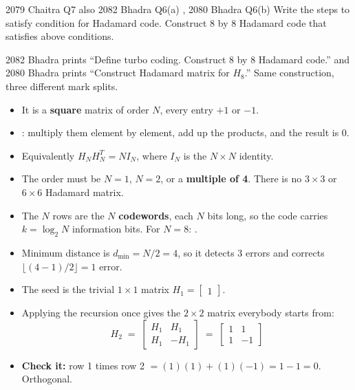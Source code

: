 \hr

{\color{sub}\footnotesize {} }

\begin{asked}{2079 Chaitra \textperiodcentered{} Q7  \; \textperiodcentered{} \; also 2082 Bhadra Q6(a) , 2080 Bhadra Q6(b) }
Write the steps to satisfy condition for Hadamard code. Construct 8 by 8 Hadamard code that
satisfies above conditions.
\par\vspace{1pt}
{\color{sub}2082 Bhadra prints ``Define turbo coding. Construct 8 by 8 Hadamard code.''
and 2080 Bhadra prints ``Construct Hadamard matrix for $H_8$.'' Same construction, three
different mark splits.}
\end{asked}

\begin{itemize}
  \item It is a \textbf{square} matrix of order $N$, every entry $+1$ or $-1$.
  \item {}: multiply them element by element, add up
        the products, and the result is 0.
  \item Equivalently $H_N H_N^{T} = N I_N$, where $I_N$ is the $N \times N$ identity.
  \item The order must be $N = 1$, $N = 2$, or a \textbf{multiple of 4}. There is no
        $3 \times 3$ or $6 \times 6$ Hadamard matrix.
  \item The $N$ rows are the $N$ \textbf{codewords}, each $N$ bits long, so the code carries
        $k = \log_2 N$ information bits. For $N = 8$: .
  \item Minimum distance is $d_{\min} = N/2 = 4$, so it detects 3 errors and corrects
        $\lfloor (4-1)/2 \rfloor = 1$ error.
\end{itemize}

\begin{itemize}
  \item The seed is the trivial $1 \times 1$ matrix \; $H_1 = \begin{bmatrix} 1 \end{bmatrix}$.
  \item Applying the recursion once gives the $2 \times 2$ matrix everybody starts from:
        \[ H_2 \;=\; \begin{bmatrix} H_1 & H_1 \\ H_1 & -H_1 \end{bmatrix}
           \;=\; \begin{bmatrix} 1 & 1 \\ 1 & -1 \end{bmatrix} \]
  \item \textbf{Check it:} row 1 times row 2 $= (1)(1) + (1)(-1) = 1 - 1 = 0$. \checkmark
        Orthogonal.
\end{itemize}

